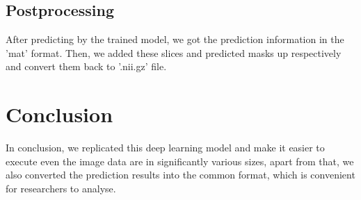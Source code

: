 \documentclass[12pt]{article}
\begin{document}
\subsection{Postprocessing}
After predicting by the trained model, we got the prediction information in the 'mat' format. Then, we added these slices and predicted masks up respectively and convert them back to '.nii.gz' file.

\section{Conclusion}
In conclusion, we replicated this deep learning model and make it easier to execute even the image data are in significantly various sizes, apart from that, we also converted the prediction results into the common format, which is convenient for researchers to analyse.






\end{document}
